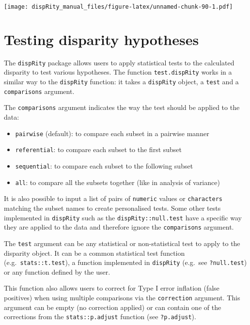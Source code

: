 \documentclass[
]{book}
\providecommand{\tightlist}{%
  \setlength{\itemsep}{0pt}\setlength{\parskip}{0pt}}
\begin{document}
\texttt{[image: dispRity\_manual\_files/figure-latex/unnamed-chunk-90-1.pdf]}

\hypertarget{testing-disparity-hypotheses}{%
\section{Testing disparity hypotheses}\label{testing-disparity-hypotheses}}

The \texttt{dispRity} package allows users to apply statistical tests to the calculated disparity to test various hypotheses.
The function \texttt{test.dispRity} works in a similar way to the \texttt{dispRity} function: it takes a \texttt{dispRity} object, a \texttt{test} and a \texttt{comparisons} argument.

The \texttt{comparisons} argument indicates the way the test should be applied to the data:

\begin{itemize}
\tightlist
\item
  \texttt{pairwise} (default): to compare each subset in a pairwise manner
\item
  \texttt{referential}: to compare each subset to the first subset
\item
  \texttt{sequential}: to compare each subset to the following subset
\item
  \texttt{all}: to compare all the subsets together (like in analysis of variance)
\end{itemize}

It is also possible to input a list of pairs of \texttt{numeric} values or \texttt{characters} matching the subset names to create personalised tests.
Some other tests implemented in \texttt{dispRity} such as the \texttt{dispRity::null.test} have a specific way they are applied to the data and therefore ignore the \texttt{comparisons} argument.

The \texttt{test} argument can be any statistical or non-statistical test to apply to the disparity object.
It can be a common statistical test function (e.g.~\texttt{stats::t.test}), a function implemented in \texttt{dispRity} (e.g.~see \texttt{?null.test}) or any function defined by the user.

This function also allows users to correct for Type I error inflation (false positives) when using multiple comparisons via the \texttt{correction} argument.
This argument can be empty (no correction applied) or can contain one of the corrections from the \texttt{stats::p.adjust} function (see \texttt{?p.adjust}).
\end{document}
